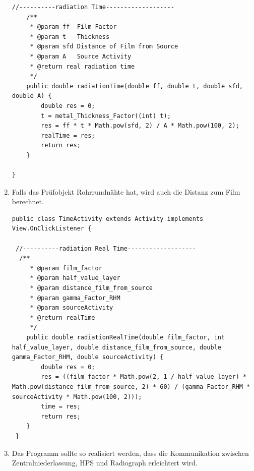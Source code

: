 \begin{enumerate}
\begin{lstlisting}[frame=single]
    //----------radiation Time-------------------
    /**
     * @param ff  Film Factor
     * @param t   Thickness
     * @param sfd Distance of Film from Source
     * @param A   Source Activity
     * @return real radiation time
     */
    public double radiationTime(double ff, double t, double sfd, double A) {
        double res = 0;
        t = metal_Thickness_Factor((int) t);
        res = ff * t * Math.pow(sfd, 2) / A * Math.pow(100, 2);
        realTime = res;
        return res;
    }
  
}

\end{lstlisting}
\item Falls das Prüfobjekt Rohrrundnähte hat, wird auch die Distanz zum Film berechnet.
\begin{lstlisting}[frame=single]
public class TimeActivity extends Activity implements View.OnClickListener {

 //----------radiation Real Time-------------------
  /**
     * @param film_factor
     * @param half_value_layer
     * @param distance_film_from_source
     * @param gamma_Factor_RHM
     * @param sourceActivity
     * @return realTime
     */
    public double radiationRealTime(double film_factor, int half_value_layer, double distance_film_from_source, double gamma_Factor_RHM, double sourceActivity) {
        double res = 0;
        res = ((film_factor * Math.pow(2, 1 / half_value_layer) * Math.pow(distance_film_from_source, 2) * 60) / (gamma_Factor_RHM * sourceActivity * Math.pow(100, 2)));
        time = res;
        return res;
    }
 }
\end{lstlisting}

\item Das Programm sollte so realisiert werden, dass die Kommunikation zwischen
Zentralniederlassung, HPS und Radiograph erleichtert wird.\\

\end{enumerate}
